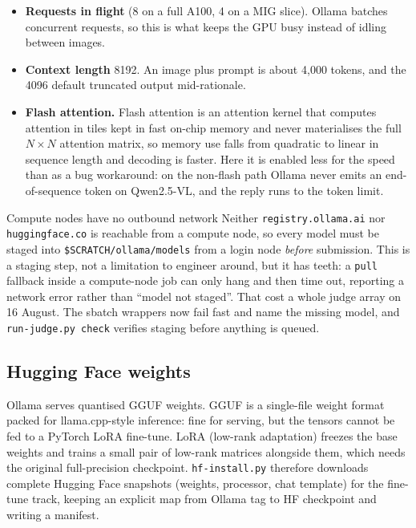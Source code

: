 \documentclass[11pt,a4paper]{article}
\newcommand{\file}[1]{{\small\texttt{#1}}}
\begin{document}
\begin{itemize}
\item \textbf{Requests in flight} (8 on a full A100, 4 on a MIG slice). Ollama
      batches concurrent requests, so this is what keeps the GPU busy instead of
      idling between images.
\item \textbf{Context length} 8192. An image plus prompt is about 4{,}000 tokens,
      and the 4096 default truncated output mid-rationale.
\item \textbf{Flash attention.} Flash attention is an attention kernel that
      computes attention in tiles kept in fast on-chip memory and never
      materialises the full $N \times N$ attention matrix, so memory use falls
      from quadratic to linear in sequence length and decoding is faster. Here it
      is enabled less for the speed than as a bug workaround: on the non-flash
      path Ollama never emits an end-of-sequence token on Qwen2.5-VL, and the
      reply runs to the token limit.
\end{itemize}

\begin{notebox}{Compute nodes have no outbound network}
Neither \texttt{registry.ollama.ai} nor \texttt{huggingface.co} is reachable from
a compute node, so every model must be staged into \file{\$SCRATCH/ollama/models}
from a login node \emph{before} submission. This is a staging step, not a
limitation to engineer around, but it has teeth: a \texttt{pull} fallback inside a
compute-node job can only hang and then time out, reporting a network error
rather than ``model not staged''. That cost a whole judge array on 16 August. The
sbatch wrappers now fail fast and name the missing model, and
\file{run-judge.py check} verifies staging before anything is queued.
\end{notebox}

\subsection{Hugging Face weights}

Ollama serves quantised GGUF weights. GGUF is a single-file weight format packed
for llama.cpp-style inference: fine for serving, but the tensors cannot be fed to
a PyTorch LoRA fine-tune. LoRA (low-rank adaptation) freezes the base weights and
trains a small pair of low-rank matrices alongside them, which needs the original
full-precision checkpoint. \file{hf-install.py} therefore downloads complete
Hugging Face snapshots (weights, processor, chat template) for the fine-tune
track, keeping an explicit map from Ollama tag to HF checkpoint and writing a
manifest.
\end{document}

